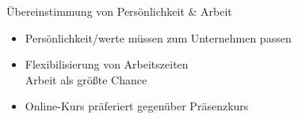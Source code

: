 \documentclass{cheatsheet}
\begin{document}
    \begin{hintbox}{Übereinstimmung von Persönlichkeit \& Arbeit}
        \begin{itemize}
            \item Persönlichkeit/werte müssen zum Unternehmen passen
            \item Flexibilisierung von Arbeitszeiten\\
            \ra Arbeit als größte Chance
            \item Online-Kurs präferiert gegenüber Präsenzkurs
        \end{itemize}
    \end{hintbox}
\end{document}
